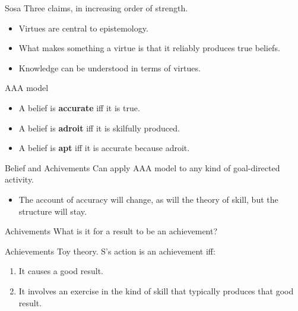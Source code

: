 \documentclass[
  17pt,
  letterpaper,
  ignorenonframetext,
  aspectratio=169,
  handout]{beamer}
\providecommand{\tightlist}{%
  \setlength{\itemsep}{0pt}\setlength{\parskip}{0pt}}\usepackage{longtable,booktabs,array}
\begin{document}
\begin{frame}{Sosa}
\protect\hypertarget{sosa}{}
Three claims, in increasing order of strength.

\begin{itemize}[<+->]
\tightlist
\item
  Virtues are central to epistemology.
\item
  What makes something a virtue is that it reliably produces true
  beliefs.
\item
  Knowledge can be understood in terms of virtues.
\end{itemize}
\end{frame}

\begin{frame}{AAA model}
\protect\hypertarget{aaa-model}{}
\begin{itemize}[<+->]
\tightlist
\item
  A belief is \textbf{accurate} iff it is true.
\item
  A belief is \textbf{adroit} iff it is skilfully produced.
\item
  A belief is \textbf{apt} iff it is accurate because adroit.
\end{itemize}
\end{frame}

\begin{frame}{Belief and Achivements}
\protect\hypertarget{belief-and-achivements}{}
Can apply AAA model to any kind of goal-directed activity.

\begin{itemize}[<+->]
\tightlist
\item
  The account of accuracy will change, as will the theory of skill, but
  the structure will stay.
\end{itemize}
\end{frame}

\begin{frame}{Achivements}
\protect\hypertarget{achivements}{}
What is it for a result to be an achievement?
\end{frame}

\begin{frame}{Achievements}
\protect\hypertarget{achievements}{}
Toy theory. S's action is an achievement iff:

\begin{enumerate}[<+->]
\tightlist
\item
  It causes a good result.
\item
  It involves an exercise in the kind of skill that typically produces
  that good result.
\end{enumerate}
\end{frame}
\end{document}
